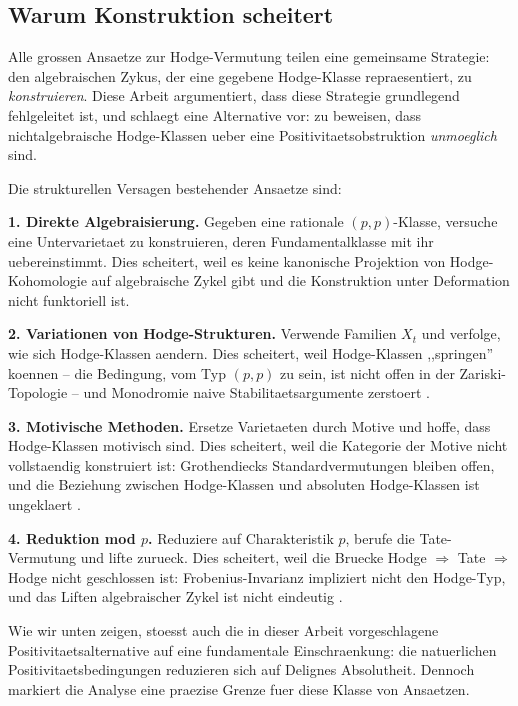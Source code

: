 \documentclass[aps,prd,twocolumn,superscriptaddress,nofootinbib]{revtex4-2}
\theoremstyle{definition}
\theoremstyle{remark}
\begin{document}
\subsection{Warum Konstruktion scheitert}

Alle grossen Ansaetze zur Hodge-Vermutung teilen eine gemeinsame Strategie: den algebraischen Zykus, der eine gegebene Hodge-Klasse repraesentiert, zu \textit{konstruieren}. Diese Arbeit argumentiert, dass diese Strategie grundlegend fehlgeleitet ist, und schlaegt eine Alternative vor: zu beweisen, dass nichtalgebraische Hodge-Klassen ueber eine Positivitaetsobstruktion \textit{unmoeglich} sind.

Die strukturellen Versagen bestehender Ansaetze sind:

\textbf{1. Direkte Algebraisierung.} Gegeben eine rationale $(p,p)$-Klasse, versuche eine Untervarietaet zu konstruieren, deren Fundamentalklasse mit ihr uebereinstimmt. Dies scheitert, weil es keine kanonische Projektion von Hodge-Kohomologie auf algebraische Zykel gibt und die Konstruktion unter Deformation nicht funktoriell ist.

\textbf{2. Variationen von Hodge-Strukturen.} Verwende Familien $X_t$ und verfolge, wie sich Hodge-Klassen aendern. Dies scheitert, weil Hodge-Klassen ,,springen'' koennen -- die Bedingung, vom Typ $(p,p)$ zu sein, ist nicht offen in der Zariski-Topologie -- und Monodromie naive Stabilitaetsargumente zerstoert \cite{Voisin2002}.

\textbf{3. Motivische Methoden.} Ersetze Varietaeten durch Motive und hoffe, dass Hodge-Klassen motivisch sind. Dies scheitert, weil die Kategorie der Motive nicht vollstaendig konstruiert ist: Grothendiecks Standardvermutungen \cite{Grothendieck1969} bleiben offen, und die Beziehung zwischen Hodge-Klassen und absoluten Hodge-Klassen ist ungeklaert \cite{Andre1996}.

\textbf{4. Reduktion mod $p$.} Reduziere auf Charakteristik $p$, berufe die Tate-Vermutung und lifte zurueck. Dies scheitert, weil die Bruecke Hodge $\Rightarrow$ Tate $\Rightarrow$ Hodge nicht geschlossen ist: Frobenius-Invarianz impliziert nicht den Hodge-Typ, und das Liften algebraischer Zykel ist nicht eindeutig \cite{Charles2013}.

Wie wir unten zeigen, stoesst auch die in dieser Arbeit vorgeschlagene Positivitaetsalternative auf eine fundamentale Einschraenkung: die natuerlichen Positivitaetsbedingungen reduzieren sich auf Delignes Absolutheit. Dennoch markiert die Analyse eine praezise Grenze fuer diese Klasse von Ansaetzen.
\end{document}
